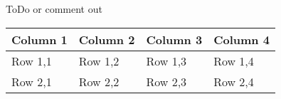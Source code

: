 \label{sec:introuduction}

ToDo or comment out

\begin{longtable}{R{0.25\totaltablewidth} | R{0.25\totaltablewidth} R{0.25\totaltablewidth} R{0.25\totaltablewidth}}
    Column 1 & Column 2 & Column 3 & Column 4 \\ \hline
    Row 1,1 & Row 1,2 & Row 1,3 & Row 1,4 \\
    Row 2,1 & Row 2,2 & Row 2,3 & Row 2,4 \\
  \end{longtable}


\pagebreak